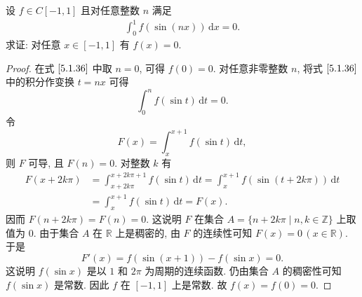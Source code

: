 \documentclass[../../main.tex]{subfiles}
\begin{document}
\begin{example}
设 \( f \in C[-1,1] \) 且对任意整数 \( n \) 满足  
\begin{align}
\int_{0}^{1} f(\sin(nx)) \, \mathrm{d}x = 0. \label{5.1.36}
\end{align}  
求证: 对任意 \( x \in [-1,1] \) 有 \( f(x) = 0 \).  
\end{example}
\begin{proof}
在式 \(\eqref{5.1.36}\) 中取 \( n = 0 \), 可得 \( f(0) = 0 \). 对任意非零整数 \( n \), 将式 \(\eqref{5.1.36}\) 中的积分作变换 \( t = nx \) 可得  
\[
\int_{0}^{n} f(\sin t) \, \mathrm{d}t = 0.
\]  
令 
\[
F(x) = \int_{x}^{x + 1} f(\sin t) \, \mathrm{d}t,
\]  
则 \( F \) 可导, 且 \( F(n) = 0 \). 对整数 \( k \) 有  
\[
\begin{aligned}
F(x + 2k\pi) &= \int_{x + 2k\pi}^{x + 2k\pi + 1} f(\sin t) \, \mathrm{d}t = \int_{x}^{x + 1} f(\sin(t + 2k\pi)) \, \mathrm{d}t \\
&= \int_{x}^{x + 1} f(\sin t) \, \mathrm{d}t = F(x).
\end{aligned}
\]  
因而 \( F(n + 2k\pi) = F(n) = 0 \). 这说明 \( F \) 在集合 \( A = \{ n + 2k\pi \mid n, k \in \mathbb{Z} \} \) 上取值为 \( 0 \). 由于集合 \( A \) 在 \( \mathbb{R} \) 上是稠密的, 由 \( F \) 的连续性可知 \( F(x) = 0 \, (x \in \mathbb{R}) \). 于是  
\[
F'(x) = f(\sin(x + 1)) - f(\sin x) = 0.
\]  
这说明 \( f(\sin x) \) 是以 \( 1 \) 和 \( 2\pi \) 为周期的连续函数. 仍由集合 \( A \) 的稠密性可知 \( f(\sin x) \) 是常数. 因此 \( f \) 在 \( [-1,1] \) 上是常数. 故 \( f(x) = f(0) = 0 \).
\end{proof}
\end{document}

